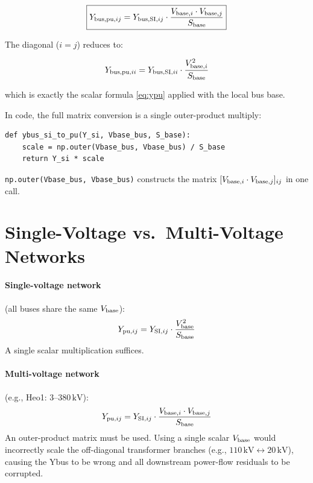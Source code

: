 \documentclass{article}
\begin{document}
\begin{equation}
  \boxed{
    Y_{{\rm bus,pu},ij}
    =
    Y_{{\rm bus,SI},ij}
    \cdot
    \frac{V_{{\rm base},i} \cdot V_{{\rm base},j}}{S_{\rm base}}
  }
  \label{eq:ybuspu}
\end{equation}

The diagonal ($i=j$) reduces to:

\begin{equation}
  Y_{{\rm bus,pu},ii}
  =
  Y_{{\rm bus,SI},ii}
  \cdot
  \frac{V_{{\rm base},i}^2}{S_{\rm base}}
\end{equation}

which is exactly the scalar formula \eqref{eq:ypu} applied with the local
bus base.

In code, the full matrix conversion is a single outer-product multiply:

\begin{verbatim}
def ybus_si_to_pu(Y_si, Vbase_bus, S_base):
    scale = np.outer(Vbase_bus, Vbase_bus) / S_base
    return Y_si * scale
\end{verbatim}

\texttt{np.outer(Vbase\_bus, Vbase\_bus)} constructs the matrix
$[V_{{\rm base},i} \cdot V_{{\rm base},j}]_{ij}$ in one call.

\section{Single-Voltage vs.\ Multi-Voltage Networks}

\paragraph{Single-voltage network} (all buses share the same $V_{\rm base}$):
\begin{equation}
  Y_{{\rm pu},ij} = Y_{{\rm SI},ij} \cdot \frac{V_{\rm base}^2}{S_{\rm base}}
\end{equation}
A single scalar multiplication suffices.

\paragraph{Multi-voltage network} (e.g., Heo1: $3$--$380\,\mathrm{kV}$):
\begin{equation}
  Y_{{\rm pu},ij} = Y_{{\rm SI},ij} \cdot \frac{V_{{\rm base},i} \cdot V_{{\rm base},j}}{S_{\rm base}}
\end{equation}
An outer-product matrix must be used.  Using a single scalar $V_{\rm base}$
would incorrectly scale the off-diagonal transformer branches (e.g.,
$110\,\mathrm{kV} \leftrightarrow 20\,\mathrm{kV}$), causing the Ybus to be
wrong and all downstream power-flow residuals to be corrupted.
\end{document}
